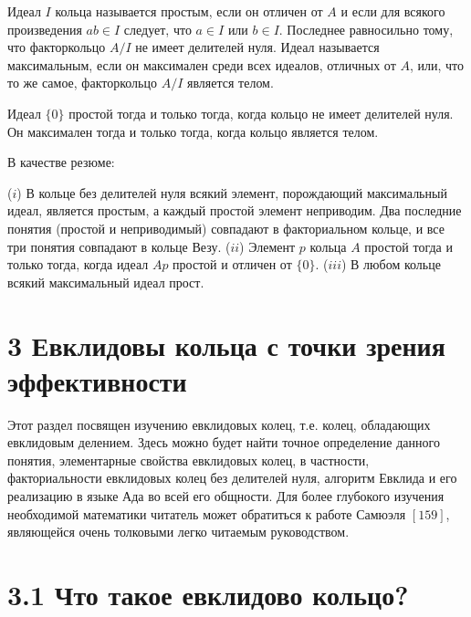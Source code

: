 \documentclass{../../template/mai_book}
\begin{document}
\begin{determ}
\textit{\indent}Идеал $I$ кольца называется простым, если он отличен от $A$ и если для всякого произведения $ab \in I$ следует, что $a \in I$ или $b \in I$. Последнее равносильно тому, что факторкольцо $A/I$ не имеет делителей нуля. \newline \indent Идеал называется максимальным, если он максимален среди всех идеалов, отличных от $A$, или, что то же самое, факторкольцо $A/I$ является телом.
\end{determ}

\begin{mynotice}
Идеал $\{0\}$ простой тогда и только тогда, когда кольцо не имеет делителей нуля. Он максимален тогда и только тогда, когда кольцо является телом.
\end{mynotice}

\newpage
\indent В качестве резюме:

\begin{predl}
\textit{\indent} ($i$) В кольце без делителей нуля всякий элемент, порождающий максимальный идеал, является простым, а каждый простой элемент неприводим. Два последние понятия (простой и неприводимый) совпадают в факториальном кольце, и все три понятия совпадают в кольце Везу. \newline \indent ($ii$) Элемент $p$ кольца $A$ простой тогда и только тогда, когда идеал $Ap$ простой и отличен от $\{0\}$. \newline \indent ($iii$) В любом кольце всякий максимальный идеал прост.
\end{predl}

\section{3 Евклидовы кольца с точки зрения эффективности}

Этот раздел посвящен изучению евклидовых колец, т.е. колец, обладающих евклидовым делением. Здесь можно будет найти точное определение данного понятия, элементарные свойства евклидовых колец, в частности, факториальности евклидовых колец без делителей нуля, алгоритм Евклида и его реализацию в языке Ада во всей его общности. Для более глубокого изучения необходимой математики читатель может обратиться к работе Самюэля $[159]$, являющейся очень толковыми легко читаемым руководством.

\section{3.1 Что такое евклидово кольцо?}
\end{document}
